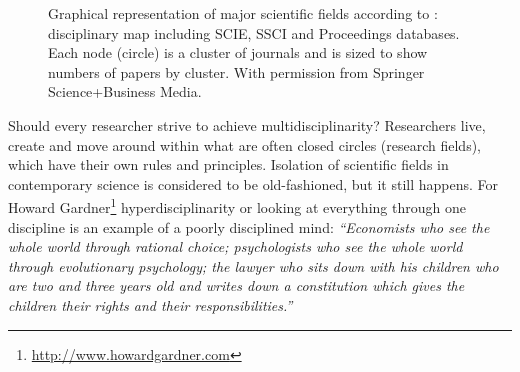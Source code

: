 \documentclass[graybox,envcountchap,sectrefs,UStrade]{svmono}
\begin{document}
\begin{figure}[!hbt]
\begin{center}
\caption{Graphical representation of major scientific fields according to \citet{Boyack2009Scientometrics}: disciplinary map including SCIE, SSCI and Proceedings databases. Each node (circle) is a cluster of journals and is sized to show numbers of papers by cluster. With permission from Springer Science+Business Media.}
\label{Fig:map_of_science}
\end{center}
\end{figure}

Should every researcher strive to achieve multidisciplinarity? Researchers live, create and move around within what are often closed circles (research fields), which have their own rules and principles. Isolation of scientific fields in contemporary science is considered to be old-fashioned, but it still happens. For Howard Gardner\footnote{\url{http://www.howardgardner.com}} hyperdisciplinarity or looking at everything through one discipline is an example of a poorly disciplined mind: \emph{``Economists who see the whole world through rational choice; psychologists who see the whole world through evolutionary psychology; the lawyer who sits down with his children who are two and three years old and writes down a constitution which gives the children their rights and their responsibilities.''} \par
\end{document}
